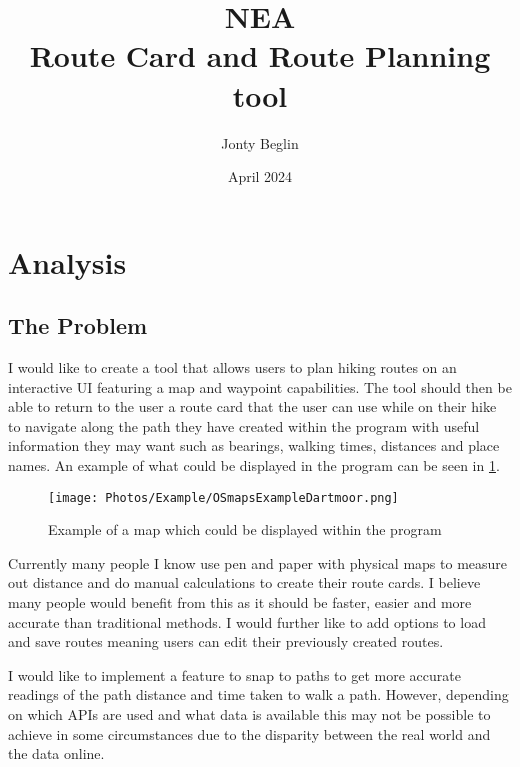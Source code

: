 \documentclass{article}
\title{NEA \\Route Card and Route Planning tool}
\author{Jonty Beglin}
\date{April 2024}
\begin{document}
\maketitle

\newpage

\tableofcontents

\newpage


\section{Analysis}

    \subsection{The Problem}

        I would like to create a tool that allows users to plan hiking routes on an interactive UI featuring a map and waypoint capabilities. The tool should then be able to return to the user a route card that the user can use while on their hike to navigate along the path they have created within the program with useful information they may want such as bearings, walking times, distances and place names. An example of what could be displayed in the program can be seen in \cref{fig:example_map_dartmoor}.

        \begin{figure}[ht]
            \centering
            \texttt{[image: Photos/Example/OSmapsExampleDartmoor.png]}
            \caption{Example of a map which could be displayed within the program}
            \label{fig:example_map_dartmoor}
         \end{figure}

         Currently many people I know use pen and paper with physical maps to measure out distance and do manual calculations to create their route cards. I believe many people would benefit from this as it should be faster, easier and more accurate than traditional methods. I would further like to add options to load and save routes meaning users can edit their previously created routes.
         
         I would like to implement a feature to snap to paths to get more accurate readings of the path distance and time taken to walk a path. However, depending on which APIs are used and what data is available this may not be possible to achieve in some circumstances due to the disparity between the real world and the data online.
         
\end{document}
